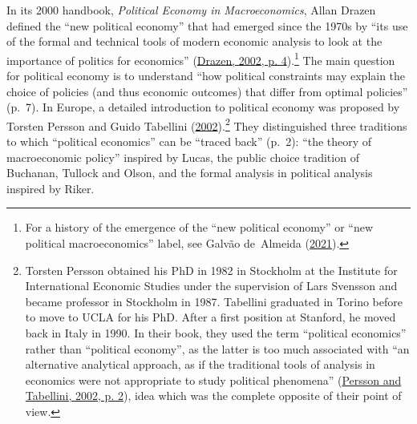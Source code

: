 \documentclass[
  12pt,
  onecolumn]{article}
\begin{document}
In its 2000 handbook, \emph{Political Economy in Macroeconomics}, Allan
Drazen defined the ``new political economy'' that had emerged since the
1970s by ``its use of the formal and technical tools of modern economic
analysis to look at the importance of politics for economics''
(\protect\hyperlink{ref-drazen2002}{Drazen, 2002, p. 4}).\footnote{For a
  history of the emergence of the ``new political economy'' or ``new
  political macroeconomics'' label, see Galvão de~Almeida
  (\protect\hyperlink{ref-galvaodealmeida2021}{2021}).} The main
question for political economy is to understand ``how political
constraints may explain the choice of policies (and thus economic
outcomes) that differ from optimal policies'' (p.~7). In Europe, a
detailed introduction to political economy was proposed by Torsten
Persson and Guido Tabellini
(\protect\hyperlink{ref-persson2002}{2002}).\footnote{Torsten Persson
  obtained his PhD in 1982 in Stockholm at the Institute for
  International Economic Studies under the supervision of Lars Svensson
  and became professor in Stockholm in 1987. Tabellini graduated in
  Torino before to move to UCLA for his PhD. After a first position at
  Stanford, he moved back in Italy in 1990. In their book, they used the
  term ``political economics'' rather than ``political economy'', as the
  latter is too much associated with ``an alternative analytical
  approach, as if the traditional tools of analysis in economics were
  not appropriate to study political phenomena''
  (\protect\hyperlink{ref-persson2002}{Persson and Tabellini, 2002, p.
  2}), idea which was the complete opposite of their point of view.}
They distinguished three traditions to which ``political economics'' can
be ``traced back'' (p.~2): ``the theory of macroeconomic policy''
inspired by Lucas, the public choice tradition of Buchanan, Tullock and
Olson, and the formal analysis in political analysis inspired by Riker.
\end{document}
